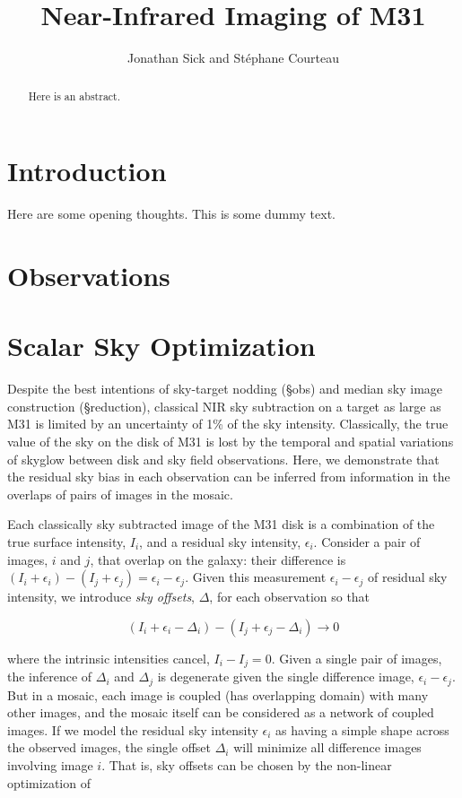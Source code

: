 \documentclass[iop]{emulateapj}
\begin{document}
\title{Near-Infrared Imaging of M31}
\author{Jonathan Sick and Stéphane Courteau}

\begin{abstract}
Here is an abstract.
\end{abstract}

\section{Introduction}

Here are some opening thoughts. This is some dummy text.

\section{Observations} %
\label{sec:Observations}

\section{Scalar Sky Optimization}

Despite the best intentions of sky-target nodding (\S obs) and median sky image construction (\S reduction), classical NIR sky subtraction on a target as large as M31 is limited by an uncertainty of 1\% of the sky intensity. Classically, the true value of the sky on the disk of M31 is lost by the temporal and spatial variations of skyglow between disk and sky field observations. Here, we demonstrate that the residual sky bias in each observation can be inferred from information in the overlaps of pairs of images in the mosaic.

Each classically sky subtracted image of the M31 disk is a combination of the true surface intensity, $I_i$, and a residual sky intensity, $\epsilon_i$. Consider a pair of images, $i$ and $j$, that overlap on the galaxy: their difference is $(I_i+\epsilon_i) - (I_j+\epsilon_j) = \epsilon_i - \epsilon_j$. Given this measurement $\epsilon_i - \epsilon_j$ of residual sky intensity, we introduce \emph{sky offsets}, $\Delta$, for each observation so that

\begin{equation}
    (I_i + \epsilon_i - \Delta_i) - (I_j + \epsilon_j - \Delta_i) \rightarrow 0
\end{equation}

\noindent where the intrinsic intensities cancel, $I_i - I_j = 0$. Given a single pair of images, the inference of $\Delta_i$ and $\Delta_j$ is degenerate given the single difference image, $\epsilon_i-\epsilon_j$. But in a mosaic, each image is coupled (has overlapping domain) with many other images, and the mosaic itself can be considered as a network of coupled images. If we model the residual sky intensity $\epsilon_i$ as having a simple shape across the observed images, the single offset $\Delta_i$ will minimize all difference images involving image $i$. That is, sky offsets can be chosen by the non-linear optimization of
\end{document}
